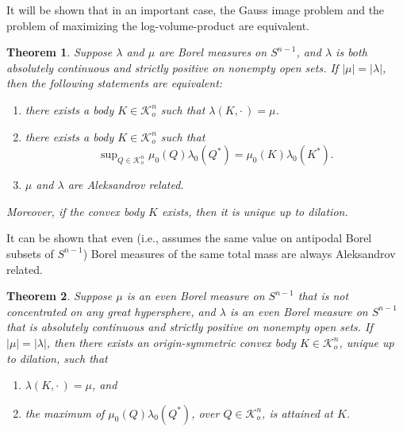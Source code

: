 \documentclass{cpamart1}     %
\newtheorem{theo}{Theorem}[section]
\theoremstyle{definition}
\theoremstyle{remark}
\newcommand{\sn}{S^{n-1}}
\newcommand{\kno}{\mathcal K^n_o}
\begin{document}



It will be shown that in an important case,
the Gauss image problem and the problem of maximizing the log-volume-product are equivalent.




\begin{theo}\label{es1}
Suppose $\lambda$ and $\mu$ are Borel measures on $S^{n-1}$, and $\lambda$ is both absolutely continuous and strictly positive on nonempty open sets.
If $|\mu|=|\lambda|$,
then the following statements are equivalent:
\begin{enumerate}
\item there exists a body $K\in \kno$ such that
$\lambda({K},\cdot\,) =\mu$.
\item there exists a body $K\in\kno$ such that
\[
\sup\nolimits_{Q\in \kno} \mu_0(Q) \lambda_0(Q^*) = \mu_0(K) \lambda_0(K^*).
\]
\item $\mu$ and $\lambda$ are Aleksandrov related.
\end{enumerate}
Moreover, if the convex body $K$ exists, then it is unique up to dilation.
\end{theo}


It can be shown that even (i.e., assumes the same value on antipodal Borel subsets
 of $\sn$) Borel measures of the same total mass are always Aleksandrov related.


\begin{theo}\label{es2}
Suppose $\mu$ is an even Borel measure on $S^{n-1}$ that is not concentrated on any great hypersphere, and $\lambda$ is an even Borel measure on $S^{n-1}$ that is absolutely continuous and strictly positive on nonempty open sets.
If
$|\mu|=|\lambda|$, then there exists an origin-symmetric convex body
$K \in \kno$, unique up to dilation,
such that
\begin{enumerate}
\item
$\lambda({K},\cdot\,) =\mu$, and
\item
the maximum of $\mu_0(Q) \lambda_0(Q^*)$, over $Q\in\kno$, is attained at $K$.
\end{enumerate}
\end{theo}
\end{document}
